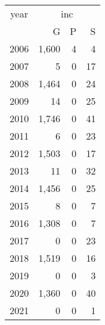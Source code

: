 \footnotesize\begin{tabular}[t]{lrrr}
\toprule
\multicolumn{1}{c}{year} & \multicolumn{3}{c}{inc} \\
\cmidrule(l{3pt}r{3pt}){1-1} \cmidrule(l{3pt}r{3pt}){2-4}
  & G & P & S\\
\midrule
2006 & 1,600 & 4 & 4\\
2007 & 5 & 0 & 17\\
2008 & 1,464 & 0 & 24\\
2009 & 14 & 0 & 25\\
2010 & 1,746 & 0 & 41\\
2011 & 6 & 0 & 23\\
2012 & 1,503 & 0 & 17\\
2013 & 11 & 0 & 32\\
2014 & 1,456 & 0 & 25\\
2015 & 8 & 0 & 7\\
2016 & 1,308 & 0 & 7\\
2017 & 0 & 0 & 23\\
2018 & 1,519 & 0 & 16\\
2019 & 0 & 0 & 3\\
2020 & 1,360 & 0 & 40\\
2021 & 0 & 0 & 1\\
\bottomrule
\end{tabular}
